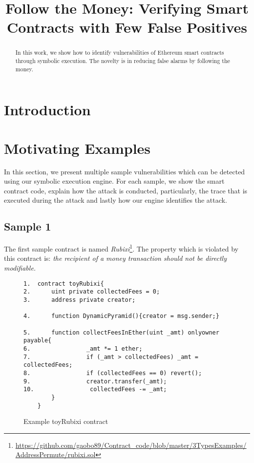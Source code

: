 \documentclass[sigconf,review,anonymous]{acmart}
\begin{document}
\title{Follow the Money: Verifying Smart Contracts with Few False Positives}

\author{}
\affiliation{\institution{}}
\email{}


\begin{abstract}
In this work, we show how to identify vulnerabilities of Ethereum smart contracts through symbolic execution. The novelty is in reducing false alarms by following the money.
\end{abstract}

\maketitle

\section{Introduction}\label{sec:introduction}

\section{Motivating Examples}
In this section, we present multiple sample vulnerabilities which can be detected using our symbolic execution engine. For each sample, we show the smart contract code, explain how the attack is conducted, particularly, the trace that is executed during the attack and lastly how our engine identifies the attack.

\subsection{Sample 1}
The first sample contract is named \emph{Rubixi}\footnote{\url{https://github.com/gaobo89/Contract_code/blob/master/3TypesExamples/AddressPermute/rubixi.sol}}. The property which is violated by this contract is: \emph{the recipient of a money transaction should not be directly modifiable.}

\begin{figure}
	{\footnotesize
	\begin{verbatim}
1.	contract toyRubixi{
2.	    uint private collectedFees = 0;
3.	    address private creator;

4.	    function DynamicPyramid(){creator = msg.sender;}
        
5.      function collectFeesInEther(uint _amt) onlyowner payable{
6.                _amt *= 1 ether;
7.                if (_amt > collectedFees) _amt = collectedFees;
8.                if (collectedFees == 0) revert();
9.                creator.transfer(_amt);
10.                collectedFees -= _amt;
        }
    }
\end{verbatim}}
\caption{Example toyRubixi contract}
\label{sample1}
\end{figure}
\end{document}
